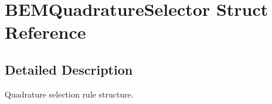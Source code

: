 \section{BEMQuadratureSelector Struct Reference}
\label{structBEMQuadratureSelector}


\subsection{Detailed Description}
Quadrature selection rule structure. 

